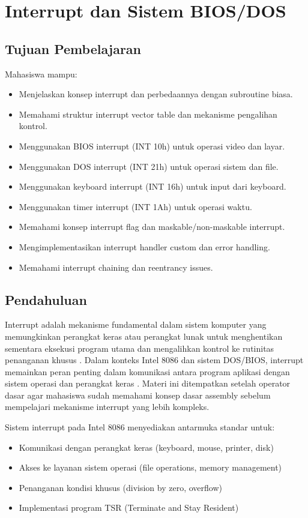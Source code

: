 \documentclass[../main.tex]{subfiles}
\begin{document}
\chapter{Interrupt dan Sistem BIOS/DOS}

    \section{Tujuan Pembelajaran}
        Mahasiswa mampu:
        \begin{itemize}
            \item Menjelaskan konsep interrupt dan perbedaannya dengan subroutine biasa.
            \item Memahami struktur interrupt vector table dan mekanisme pengalihan kontrol.
            \item Menggunakan BIOS interrupt (INT 10h) untuk operasi video dan layar.
            \item Menggunakan DOS interrupt (INT 21h) untuk operasi sistem dan file.
            \item Menggunakan keyboard interrupt (INT 16h) untuk input dari keyboard.
            \item Menggunakan timer interrupt (INT 1Ah) untuk operasi waktu.
            \item Memahami konsep interrupt flag dan maskable/non-maskable interrupt.
            \item Mengimplementasikan interrupt handler custom dan error handling.
            \item Memahami interrupt chaining dan reentrancy issues.
        \end{itemize}

    \section{Pendahuluan}
        Interrupt adalah mekanisme fundamental dalam sistem komputer yang memungkinkan perangkat keras atau perangkat lunak untuk menghentikan sementara eksekusi program utama dan mengalihkan kontrol ke rutinitas penanganan khusus \cite{rbil}. Dalam konteks Intel 8086 dan sistem DOS/BIOS, interrupt memainkan peran penting dalam komunikasi antara program aplikasi dengan sistem operasi dan perangkat keras \cite{osdev_wiki}. Materi ini ditempatkan setelah operator dasar agar mahasiswa sudah memahami konsep dasar assembly sebelum mempelajari mekanisme interrupt yang lebih kompleks.

        Sistem interrupt pada Intel 8086 menyediakan antarmuka standar untuk:
        \begin{itemize}
            \item Komunikasi dengan perangkat keras (keyboard, mouse, printer, disk)
            \item Akses ke layanan sistem operasi (file operations, memory management)
            \item Penanganan kondisi khusus (division by zero, overflow)
            \item Implementasi program TSR (Terminate and Stay Resident)
        \end{itemize}
\end{document}
